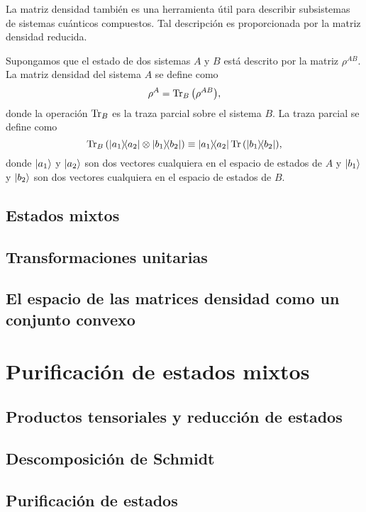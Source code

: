 \documentclass[12pt]{report}
\begin{document}
La matriz densidad también es una herramienta útil para describir subsistemas de sistemas cuánticos compuestos.
Tal descripción es proporcionada por la matriz densidad reducida. 

Supongamos que el estado de dos sistemas $A$ y $B$ está descrito por la matriz $\rho ^{AB}$. La matriz densidad del
sistema $A$ se define como
\begin{equation}
\rho ^A=\Tr _B\qty(\rho ^{AB}),
\label{eq:reduced_DM}
\end{equation}
donde la operación $\Tr _B$ es la traza parcial sobre el sistema $B$. La traza parcial se define como
\begin{equation}
\Tr _B\qty(\dyad{a_1}{a_2}\otimes \dyad{b_1}{b_2}) \equiv \dyad{a_1}{a_2}\Tr \qty(\dyad{b_1}{b_2}),
\end{equation}
donde $\ket{a_1}$ y $\ket{a_2}$ son dos vectores cualquiera en el espacio de estados de $A$ y $\ket{b_1}$ y $\ket{b_2}$
son dos vectores cualquiera en el espacio de estados de $B$. 


\section{Estados mixtos}

\section{Transformaciones unitarias}

\section{El espacio de las matrices densidad como un conjunto convexo}

\chapter{Purificación de estados mixtos}

\section{Productos tensoriales y reducción de estados}

\section{Descomposición de Schmidt}

\section{Purificación de estados}
\end{document}
